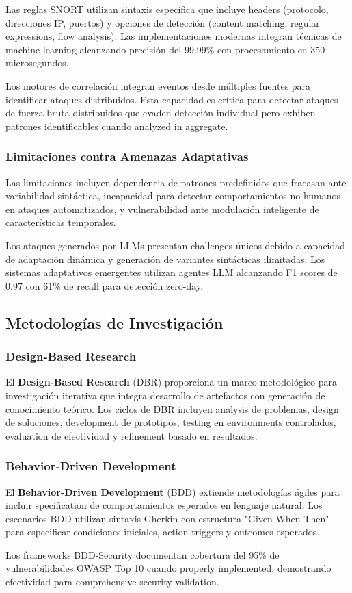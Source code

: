 Las reglas SNORT utilizan sintaxis específica que incluye headers (protocolo, direcciones IP, puertos) y opciones de detección (content matching, regular expressions, flow analysis). Las implementaciones modernas \cite{Tanaka2024SnortML} integran técnicas de machine learning alcanzando precisión del 99.99\% con procesamiento en 350 microsegundos.

Los motores de correlación integran eventos desde múltiples fuentes para identificar ataques distribuidos. Esta capacidad es crítica para detectar ataques de fuerza bruta distribuidos que evaden detección individual pero exhiben patrones identificables cuando analyzed in aggregate.

\subsubsection{Limitaciones contra Amenazas Adaptativas}

Las limitaciones incluyen dependencia de patrones predefinidos que fracasan ante variabilidad sintáctica, incapacidad para detectar comportamientos no-humanos en ataques automatizados, y vulnerabilidad ante modulación inteligente de características temporales.

Los ataques generados por LLMs presentan challenges únicos debido a capacidad de adaptación dinámica y generación de variantes sintácticas ilimitadas. Los sistemas adaptativos emergentes \cite{Garcia2024IDSAgent} utilizan agentes LLM alcanzando F1 scores de 0.97 con 61\% de recall para detección zero-day.

\subsection{Metodologías de Investigación}

\subsubsection{Design-Based Research}

El \textbf{Design-Based Research} (DBR) proporciona un marco metodológico para investigación iterativa que integra desarrollo de artefactos con generación de conocimiento teórico. Los ciclos de DBR incluyen analysis de problemas, design de soluciones, development de prototipos, testing en environments controlados, evaluation de efectividad y refinement basado en resultados.

\subsubsection{Behavior-Driven Development}

El \textbf{Behavior-Driven Development} (BDD) extiende metodologías ágiles para incluir specification de comportamientos esperados en lenguaje natural. Los escenarios BDD utilizan sintaxis Gherkin con estructura "Given-When-Then" para especificar condiciones iniciales, action triggers y outcomes esperados.

Los frameworks BDD-Security \cite{Davis2024BDDSecurity} documentan cobertura del 95\% de vulnerabilidades OWASP Top 10 cuando properly implemented, demostrando efectividad para comprehensive security validation.
